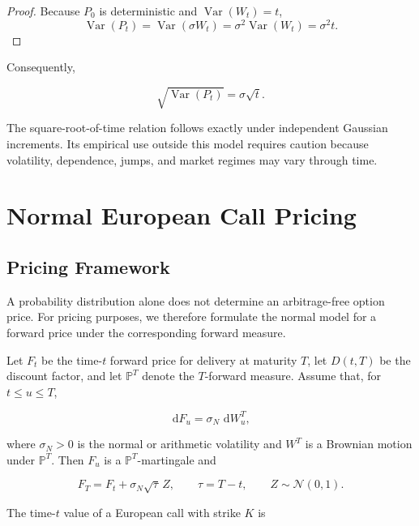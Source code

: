 \documentclass[11pt,a4paper]{article}
\DeclareMathOperator{\Var}{Var}
\newcommand{\Prob}{\mathbb{P}}
\newcommand{\dd}{\,\mathrm{d}}
\begin{document}
\begin{proof}
Because \(P_0\) is deterministic and \(\Var(W_t)=t\),
\[
\Var(P_t)=\Var(\sigma W_t)=\sigma^2\Var(W_t)=\sigma^2t.
\]
\end{proof}

Consequently,

\begin{equation}
\sqrt{\Var(P_t)}=\sigma\sqrt{t}.
\label{eq:sqrt-time-volatility}
\end{equation}

The square-root-of-time relation follows exactly under independent Gaussian increments. Its empirical use outside this model requires caution because volatility, dependence, jumps, and market regimes may vary through time.

\section{Normal European Call Pricing}

\subsection{Pricing Framework}

A probability distribution alone does not determine an arbitrage-free option price. For pricing purposes, we therefore formulate the normal model for a forward price under the corresponding forward measure.

Let \(F_t\) be the time-\(t\) forward price for delivery at maturity \(T\), let \(D(t,T)\) be the discount factor, and let \(\Prob^T\) denote the \(T\)-forward measure. Assume that, for \(t\leq u\leq T\),

\begin{equation}
\dd F_u=\sigma_N\,\dd W_u^T,
\label{eq:forward-normal-dynamics}
\end{equation}

where \(\sigma_N>0\) is the normal or arithmetic volatility and \(W^T\) is a Brownian motion under \(\Prob^T\). Then \(F_u\) is a \(\Prob^T\)-martingale and

\begin{equation}
F_T=F_t+\sigma_N\sqrt{\tau}\,Z,
\qquad \tau=T-t,
\qquad Z\sim\mathcal{N}(0,1).
\label{eq:forward-terminal-law}
\end{equation}

The time-\(t\) value of a European call with strike \(K\) is
\end{document}
